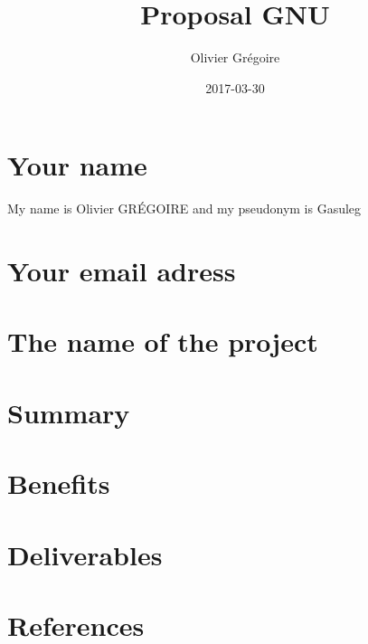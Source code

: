 \documentclass{article}
\title{Proposal GNU}
\date{2017-03-30}
\author{Olivier Grégoire}
\begin{document}
\section{Your name}
My name is Olivier GRÉGOIRE and my pseudonym is Gasuleg
\section{Your email adress}
\section{The name of the project}
\section{Summary}
\section{Benefits}
\section{Deliverables}
\section{References}
\end{document}
